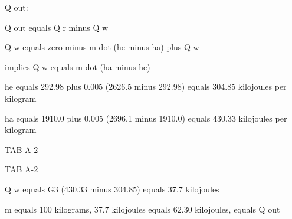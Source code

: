 Q out:

Q out equals Q r minus Q w

Q w equals zero minus m dot (he minus ha) plus Q w

implies Q w equals m dot (ha minus he)

he equals 292.98 plus 0.005 (2626.5 minus 292.98) equals 304.85 kilojoules per kilogram

ha equals 1910.0 plus 0.005 (2696.1 minus 1910.0) equals 430.33 kilojoules per kilogram

TAB A-2

TAB A-2

Q w equals G3 (430.33 minus 304.85) equals 37.7 kilojoules

m equals 100 kilograms, 37.7 kilojoules equals 62.30 kilojoules, equals Q out